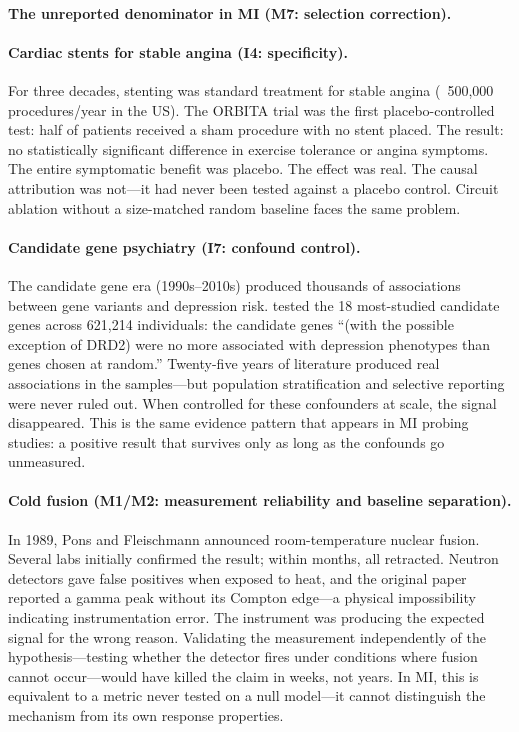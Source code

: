 \documentclass{article}
\begin{document}
\paragraph{The unreported denominator in MI (M7: selection correction).}


\paragraph{Cardiac stents for stable angina (I4: specificity).}
For three decades, stenting was standard treatment for stable angina (~500,000 procedures/year in the US). The ORBITA trial \citep{alhabib2018orbita} was the first placebo-controlled test: half of patients received a sham procedure with no stent placed. The result: no statistically significant difference in exercise tolerance or angina symptoms. The entire symptomatic benefit was placebo. The effect was real. The causal attribution was not---it had never been tested against a placebo control. Circuit ablation without a size-matched random baseline faces the same problem.

\paragraph{Candidate gene psychiatry (I7: confound control).}
The candidate gene era (1990s--2010s) produced thousands of associations between gene variants and depression risk. \citet{border2019no} tested the 18 most-studied candidate genes across 621,214 individuals: the candidate genes ``(with the possible exception of DRD2) were no more associated with depression phenotypes than genes chosen at random.'' Twenty-five years of literature produced real associations in the samples---but population stratification and selective reporting were never ruled out. When \citet{border2019no} controlled for these confounders at scale, the signal disappeared. This is the same evidence pattern that appears in MI probing studies: a positive result that survives only as long as the confounds go unmeasured.

\paragraph{Cold fusion (M1/M2: measurement reliability and baseline separation).}
In 1989, Pons and Fleischmann announced room-temperature nuclear fusion. Several labs initially confirmed the result; within months, all retracted. Neutron detectors gave false positives when exposed to heat, and the original paper reported a gamma peak without its Compton edge---a physical impossibility indicating instrumentation error. The instrument was producing the expected signal for the wrong reason. Validating the measurement independently of the hypothesis---testing whether the detector fires under conditions where fusion cannot occur---would have killed the claim in weeks, not years. In MI, this is equivalent to a metric never tested on a null model---it cannot distinguish the mechanism from its own response properties.
\end{document}
